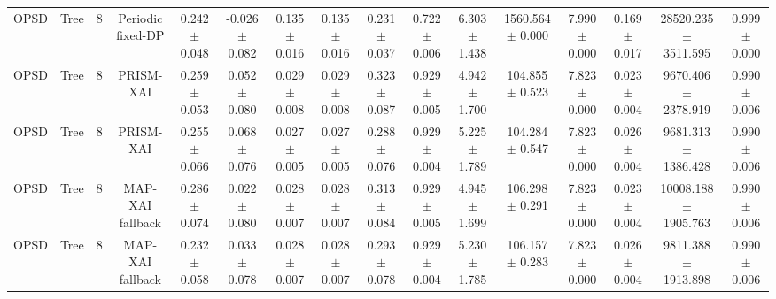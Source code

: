 \begin{tabular}{lccccccccccccccc}
OPSD & Tree & 8 & Periodic fixed-DP & 0.242 $\pm$ 0.048 & -0.026 $\pm$ 0.082 & 0.135 $\pm$ 0.016 & 0.135 $\pm$ 0.016 & 0.231 $\pm$ 0.037 & 0.722 $\pm$ 0.006 & 6.303 $\pm$ 1.438 & 1560.564 $\pm$ 0.000 & 7.990 $\pm$ 0.000 & 0.169 $\pm$ 0.017 & 28520.235 $\pm$ 3511.595 & 0.999 $\pm$ 0.000 \\
OPSD & Tree & 8 & PRISM-XAI & 0.259 $\pm$ 0.053 & 0.052 $\pm$ 0.080 & 0.029 $\pm$ 0.008 & 0.029 $\pm$ 0.008 & 0.323 $\pm$ 0.087 & 0.929 $\pm$ 0.005 & 4.942 $\pm$ 1.700 & 104.855 $\pm$ 0.523 & 7.823 $\pm$ 0.000 & 0.023 $\pm$ 0.004 & 9670.406 $\pm$ 2378.919 & 0.990 $\pm$ 0.006 \\
OPSD & Tree & 8 & PRISM-XAI & 0.255 $\pm$ 0.066 & 0.068 $\pm$ 0.076 & 0.027 $\pm$ 0.005 & 0.027 $\pm$ 0.005 & 0.288 $\pm$ 0.076 & 0.929 $\pm$ 0.004 & 5.225 $\pm$ 1.789 & 104.284 $\pm$ 0.547 & 7.823 $\pm$ 0.000 & 0.026 $\pm$ 0.004 & 9681.313 $\pm$ 1386.428 & 0.990 $\pm$ 0.006 \\
OPSD & Tree & 8 & MAP-XAI fallback & 0.286 $\pm$ 0.074 & 0.022 $\pm$ 0.080 & 0.028 $\pm$ 0.007 & 0.028 $\pm$ 0.007 & 0.313 $\pm$ 0.084 & 0.929 $\pm$ 0.005 & 4.945 $\pm$ 1.699 & 106.298 $\pm$ 0.291 & 7.823 $\pm$ 0.000 & 0.023 $\pm$ 0.004 & 10008.188 $\pm$ 1905.763 & 0.990 $\pm$ 0.006 \\
OPSD & Tree & 8 & MAP-XAI fallback & 0.232 $\pm$ 0.058 & 0.033 $\pm$ 0.078 & 0.028 $\pm$ 0.007 & 0.028 $\pm$ 0.007 & 0.293 $\pm$ 0.078 & 0.929 $\pm$ 0.004 & 5.230 $\pm$ 1.785 & 106.157 $\pm$ 0.283 & 7.823 $\pm$ 0.000 & 0.026 $\pm$ 0.004 & 9811.388 $\pm$ 1913.898 & 0.990 $\pm$ 0.006 \\
\bottomrule
\end{tabular}
